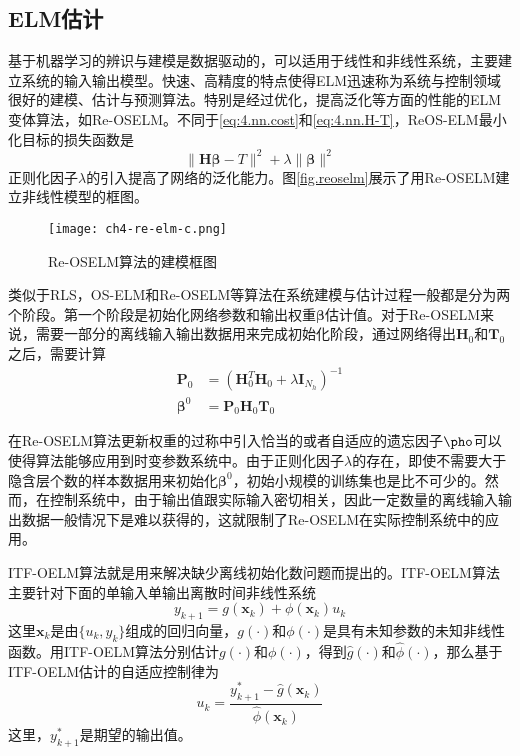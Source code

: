 \subsection{ELM估计}
基于机器学习的辨识与建模是数据驱动的，可以适用于线性和非线性系统，主要建立系统的输入输出模型。快速、高精度的特点使得ELM迅速称为系统与控制领域很好的建模、估计与预测算法。特别是经过优化，提高泛化等方面的性能的ELM变体算法，如Re-OSELM。不同于\eqref{eq:4.nn.cost}和\eqref{eq:4.nn.H-T}，ReOS-ELM最小化目标的损失函数是
\begin{equation}\label{eq:4.re.cost}
\|\bm{H}\bm{\beta}-T\|^{2}+\lambda\|\bm{\beta}\|^{2}
\end{equation}
正则化因子$\lambda$的引入提高了网络的泛化能力。图\eqref{fig.reoselm}展示了用Re-OSELM建立非线性模型的框图。

\begin{figure}[!htb]
  \centering
  \texttt{[image: ch4-re-elm-c.png]}\\	 %
  \caption{Re-OSELM算法的建模框图}
  \label{fig.reoselm}
\end{figure}

类似于RLS，OS-ELM和Re-OSELM等算法在系统建模与估计过程一般都是分为两个阶段。第一个阶段是初始化网络参数和输出权重$\bm{\beta}$估计值。对于Re-OSELM来说，需要一部分的离线输入输出数据用来完成初始化阶段，通过网络得出$\bm{H}_{0}$和$\bm{T}_{0}$之后，需要计算
\begin{equation}
\begin{split}%
\bm{P}_{0}&=(\bm{H}_{0}^{T}\bm{H}_{0}+\lambda \bm{I}_{N_{h}})^{-1}\\
\bm{\beta}^{0}&=\bm{P}_{0}\bm{H}_{0}\bm{T}_{0}
\end{split}
\end{equation}

在Re-OSELM算法更新权重的过称中引入恰当的或者自适应的遗忘因子$\pho$可以使得算法能够应用到时变参数系统中。由于正则化因子$\lambda$的存在，即使不需要大于隐含层个数的样本数据用来初始化$\bm{\beta}^{0}$，初始小规模的训练集也是比不可少的。然而，在控制系统中，由于输出值跟实际输入密切相关，因此一定数量的离线输入输出数据一般情况下是难以获得的，这就限制了Re-OSELM在实际控制系统中的应用。

ITF-OELM算法就是用来解决缺少离线初始化数问题而提出的。ITF-OELM算法主要针对下面的单输入单输出离散时间非线性系统
\begin{equation}\label{eq:4.siso}
y_{k+1} = g(\bm{x}_{k})+\phi(\bm{x}_{k})u_{k}
\end{equation}
这里$\bm{x}_{k}$是由$\{u_{k},y_{k}\}$组成的回归向量，$g(\cdot)$和$\phi(\cdot)$是具有未知参数的未知非线性函数。用ITF-OELM算法分别估计$g(\cdot)$和$\phi(\cdot)$，得到$\hat{g}(\cdot)$和$\hat{\phi}(\cdot)$，那么基于ITF-OELM估计的自适应控制律为
\begin{equation}\label{eq:4.itf.u}
u_{k}=\frac{y_{k+1}^{*}-\hat{g}(\bm{x}_{k})}{\hat{\phi}(\bm{x}_{k})} 
\end{equation}
这里，$y_{k+1}^{*}$是期望的输出值。


